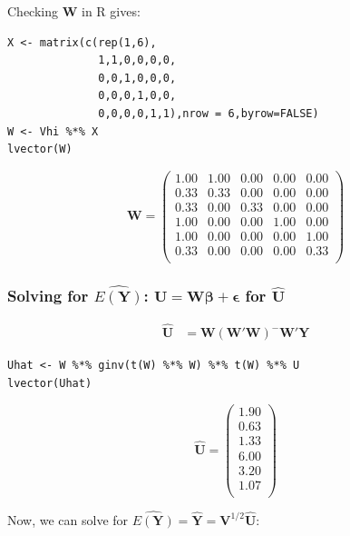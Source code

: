\documentclass[11pt]{article}
\begin{document}
Checking \textbf{W} in R gives:

\begin{verbatim}
X <- matrix(c(rep(1,6),
              1,1,0,0,0,0,
              0,0,1,0,0,0,
              0,0,0,1,0,0,
              0,0,0,0,1,1),nrow = 6,byrow=FALSE)
W <- Vhi %*% X
lvector(W)
\end{verbatim}

\[
\mathbf{W} =
\begin{pmatrix}{}
  1.00 & 1.00 & 0.00 & 0.00 & 0.00 \\ 
  0.33 & 0.33 & 0.00 & 0.00 & 0.00 \\ 
  0.33 & 0.00 & 0.33 & 0.00 & 0.00 \\ 
  1.00 & 0.00 & 0.00 & 1.00 & 0.00 \\ 
  1.00 & 0.00 & 0.00 & 0.00 & 1.00 \\ 
  0.33 & 0.00 & 0.00 & 0.00 & 0.33 \\ 
  \end{pmatrix}
\]
\subsubsection{Solving for $\widehat{E(\mathbf{Y})}$: $\mathbf{U} = \mathbf{W\beta} + \mathbf{\epsilon}$ for $\hat{\mathbf{U}}$}
\label{sec-2-1-1}


\begin{align*}
\hat{\mathbf{U}} &=
\mathbf{W}(\mathbf{W}'\mathbf{W})^{-}\mathbf{W}'\mathbf{Y}
\end{align*}

\begin{verbatim}
Uhat <- W %*% ginv(t(W) %*% W) %*% t(W) %*% U
lvector(Uhat)
\end{verbatim}

\[
\hat{\mathbf{U}} =
\begin{pmatrix}{}
  1.90 \\ 
  0.63 \\ 
  1.33 \\ 
  6.00 \\ 
  3.20 \\ 
  1.07 \\ 
  \end{pmatrix}
\]

Now, we can solve for $\hat{E(\mathbf{Y})} = \hat{\mathbf{Y}} =
\mathbf{V}^{1/2}\hat{\mathbf{U}}$:
\end{document}
